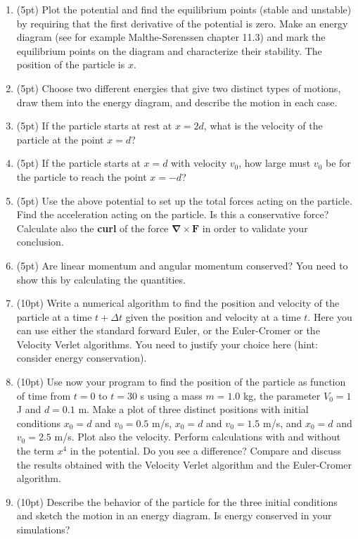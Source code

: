 \documentclass[%
oneside,                 %
final,                   %
10pt]{article}
\begin{document}
\begin{enumerate}
\item (5pt) Plot the potential and find the  equilibrium points (stable and unstable) by requiring that the first derivative of the potential is zero. Make an energy diagram (see for example Malthe-Sørenssen chapter 11.3) and mark the equilibrium points on the diagram and characterize their stability. The position of the particle is $x$. 

\item (5pt) Choose two different energies that give two distinct types of motions, draw them into the energy diagram, and describe the motion in each case.

\item (5pt) If the particle  starts at rest at $x=2d$, what is the velocity of the particle at the point $x=d$?

\item (5pt) If the particle  starts at $x=d$ with velocity $v_0$, how large must $v_0$ be for the  particle to reach the point $x=−d$?

\item (5pt) Use the above potential to set up the total forces acting on the particle.  Find the acceleration acting on the particle. Is this a conservative force? Calculate also the \textbf{curl} of the force  $\bm{\nabla}\times \bm{F}$ in order to validate your conclusion. 

\item (5pt) Are linear momentum and angular momentum conserved? You need to show this by calculating the quantities.

\item (10pt) Write a numerical algorithm to find the position and velocity of the particle at a time $t+\Delta t$ given the position and velocity at a time $t$. Here you can use either the standard forward Euler, or the Euler-Cromer or the Velocity Verlet algorithms.   You need to justify your choice here (hint: consider energy conservation).

\item (10pt) Use now your program to find the position of the particle as function of time from $t=0$ to $t=30$ s using a mass  $m=1.0$ kg, the parameter $V_0=1$ J and $d=0.1$ m. Make a plot of three distinct positions with initial conditions $x_0=d$ and $v_0=0.5$ m/s, $x_0=d$ and $v_0=1.5$ m/s, and $x_0=d$ and $v_0=2.5$ m/s. Plot also the velocity.  Perform calculations with and without the term $x^4$ in the potential. Do you see a difference? Compare and discuss the results obtained with the Velocity Verlet algorithm and the Euler-Cromer algorithm. 

\item (10pt) Describe the behavior of the particle for the three initial conditions  and sketch the motion in an energy diagram. Is energy conserved in your simulations?
\end{enumerate}
\end{document}
